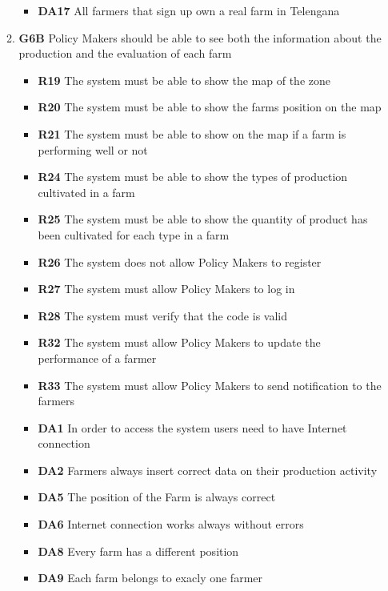 \begin{itemize}
\begin{enumerate}
\begin{itemize}
                \item \textbf{DA17} All farmers that sign up own a real farm in Telengana
            \end{itemize}
            \item\textbf{G6B} Policy Makers should be able to see both the information about the production and the evaluation of each farm
            \begin{itemize}
                \renewcommand\labelitemi{--}
                \item \textbf{R19} The system must be able to show the map of the zone
                \item \textbf{R20} The system must be able to show the farms position on the map
                \item \textbf{R21} The system must be able to show on the map if a farm is performing well or not
                \item \textbf{R24} The system must be able to show the types of production cultivated in a farm
                \item \textbf{R25} The system must be able to show the quantity of product has been cultivated for each type in a farm
                \item \textbf{R26} The system does not allow Policy Makers to register
                \item \textbf{R27} The system must allow Policy Makers to log in
                \item \textbf{R28} The system must verify that the code is valid
                \item \textbf{R32} The system must allow Policy Makers to update the performance of a farmer
                \item \textbf{R33} The system must allow Policy Makers to send notification to the farmers
                \item \textbf{DA1} In order to access the system users need to have Internet connection
                \item \textbf{DA2} Farmers always insert correct data on their production activity
                \item \textbf{DA5} The position of the Farm is always correct
                \item \textbf{DA6} Internet connection works always without errors
                \item \textbf{DA8} Every farm has a different position
                \item \textbf{DA9} Each farm belongs to exacly one farmer

\end{itemize}
\end{enumerate}
\end{itemize}
